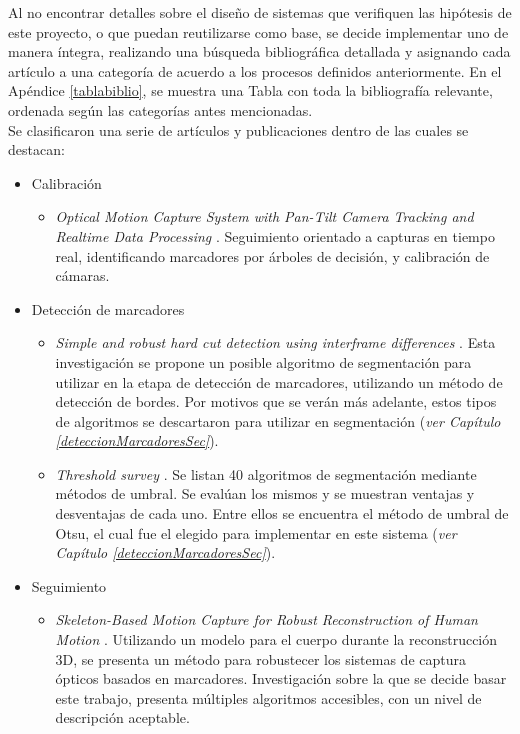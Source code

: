 Al no encontrar detalles sobre el diseño de sistemas que verifiquen las hipótesis de este proyecto, o que puedan reutilizarse como base, se decide implementar uno de manera íntegra, realizando una búsqueda bibliográfica detallada y asignando cada artículo a una categoría de acuerdo a los procesos definidos anteriormente. En el Apéndice \ref{tablabiblio}, se muestra una Tabla con toda la bibliografía relevante, ordenada según las categorías antes mencionadas.
\\ 

Se clasificaron una serie de artículos y publicaciones dentro de las cuales se destacan:

\begin{itemize}
	\item Calibración
	\begin{itemize}
		\item \emph{Optical Motion Capture System with Pan-Tilt Camera Tracking and Realtime Data Processing} \cite{kurihara2002optical}. Seguimiento orientado a capturas en tiempo real, identificando marcadores por árboles de decisión, y calibración de cámaras.
	\end{itemize}
	\item Detección de marcadores
	\begin{itemize}
		\item \emph{Simple and robust hard cut detection using interframe differences} \cite{pardo2005simple}. Esta investigación se propone un posible algoritmo de segmentación para utilizar en la etapa de detección de marcadores, utilizando un método de detección de bordes. Por motivos que se verán más adelante, estos tipos de algoritmos se descartaron para utilizar en segmentación (\textit{ver Capítulo \ref{deteccionMarcadoresSec}}).
		\item \emph{Threshold survey} \cite{surveyThreshold}. Se listan 40 algoritmos de segmentación mediante métodos de umbral. Se evalúan los mismos y se muestran ventajas y desventajas de cada uno. Entre ellos se encuentra el método de umbral de Otsu\cite{otsu}, el cual fue el elegido para implementar en este sistema (\textit{ver Capítulo \ref{deteccionMarcadoresSec}}).
	\end{itemize}
	\item Seguimiento
	\begin{itemize}
		\item \emph{Skeleton-Based Motion Capture for Robust Reconstruction of Human Motion} \cite{herda}. Utilizando un modelo para el cuerpo durante la reconstrucción 3D, se presenta un método para robustecer los sistemas de captura ópticos basados en marcadores. Investigación sobre la que se decide basar este trabajo, presenta múltiples algoritmos accesibles, con un nivel de descripción aceptable.

\end{itemize}
\end{itemize}
